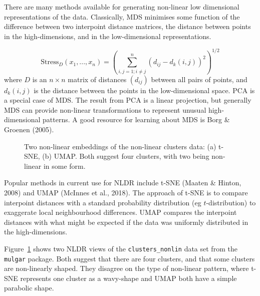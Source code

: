 \documentclass[
  letterpaper,
]{krantz}
\begin{document}
There are many methods available for generating non-linear low
dimensional representations of the data. Classically, MDS minimises some
function of the difference between two interpoint distance matrices, the
distance between points in the high-dimensions, and in the
low-dimensional representations.

\[
\mbox{Stress}_D(x_1, ..., x_n) = \left(\sum_{i, j=1; i\neq j}^n (d_{ij} - d_k(i,j))^2\right)^{1/2}
\] where \(D\) is an \(n\times n\) matrix of distances \((d_{ij})\)
between all pairs of points, and \(d_k(i,j)\) is the distance between
the points in the low-dimensional space. PCA is a special case of MDS.
The result from PCA is a linear projection, but generally MDS can
provide non-linear transformations to represent unusual high-dimensional
patterns. A good resource for learning about MDS is Borg \& Groenen
(2005).

 

\begin{figure}


\caption{\label{fig-nldr-clusters}Two non-linear embeddings of the
non-linear clusters data: (a) t-SNE, (b) UMAP. Both suggest four
clusters, with two being non-linear in some form.}

\end{figure}%

Popular methods in current use for NLDR include t-SNE (Maaten \& Hinton,
2008) and UMAP (McInnes et al., 2018). The approach of t-SNE is to
compare interpoint distances with a standard probability distribution
(eg \(t\)-distribution) to exaggerate local neighbourhood differences.
UMAP compares the interpoint distances with what might be expected if
the data was uniformly distributed in the high-dimensions.

Figure~\ref{fig-nldr-clusters} shows two NLDR views of the
\texttt{clusters\_nonlin} data set from the \texttt{mulgar} package.
Both suggest that there are four clusters, and that some clusters are
non-linearly shaped. They disagree on the type of non-linear pattern,
where t-SNE represents one cluster as a wavy-shape and UMAP both have a
simple parabolic shape.
\end{document}
